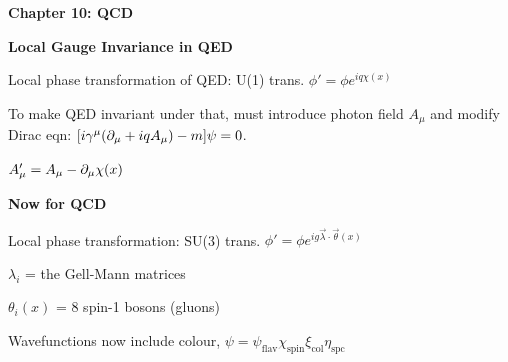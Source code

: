\textbf{Chapter 10: QCD}

\textbf{Local Gauge Invariance in QED}

Local phase transformation of QED: U(1) trans. $\phi' = \phi e^{iq\chi(x)}$

To make QED invariant under that, must introduce photon field $A_\mu$ and modify Dirac eqn: $[i\gamma^\mu(\partial_\mu + iqA_\mu) - m]\psi = 0$.

$A_\mu' = A_\mu - \partial_\mu \chi(x)$

\textbf{Now for QCD}

Local phase transformation: SU(3) trans. $\phi' = \phi e^{ig\vec{\lambda} \cdot \vec{\theta}(x)}$

$\lambda_i$ = the Gell-Mann matrices

$\theta_i(x)$ = 8 spin-1 bosons (gluons)

Wavefunctions now include colour, $\psi = \psi_{\text{flav}}\chi_{\text{spin}}\xi_{\text{col}}\eta_{\text{spc}}$

